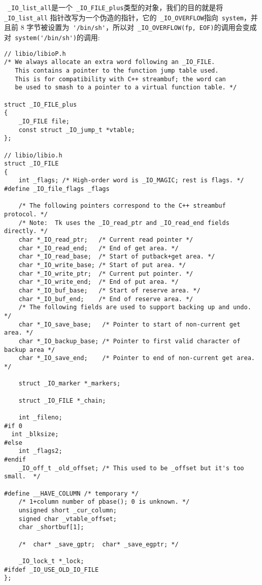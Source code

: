 \verb+ _IO_list_all+是一个\verb+ _IO_FILE_plus+类型的对象，我们的目的就是将\verb+ _IO_list_all+ 指针改写为一个伪造的指针，它的\verb+ _IO_OVERFLOW+指向\verb+ system+，并且前 8 字节被设置为\verb+ '/bin/sh'+，所以对\verb+ _IO_OVERFLOW(fp, EOF)+的调用会变成对\verb+ system('/bin/sh')+的调用:
\begin{verbatim}
// libio/libioP.h
/* We always allocate an extra word following an _IO_FILE.
   This contains a pointer to the function jump table used.
   This is for compatibility with C++ streambuf; the word can
   be used to smash to a pointer to a virtual function table. */

struct _IO_FILE_plus
{
    _IO_FILE file;
    const struct _IO_jump_t *vtable;
};

// libio/libio.h
struct _IO_FILE
{
    int _flags; /* High-order word is _IO_MAGIC; rest is flags. */
#define _IO_file_flags _flags

    /* The following pointers correspond to the C++ streambuf protocol. */
    /* Note:  Tk uses the _IO_read_ptr and _IO_read_end fields directly. */
    char *_IO_read_ptr;   /* Current read pointer */
    char *_IO_read_end;   /* End of get area. */
    char *_IO_read_base;  /* Start of putback+get area. */
    char *_IO_write_base; /* Start of put area. */
    char *_IO_write_ptr;  /* Current put pointer. */
    char *_IO_write_end;  /* End of put area. */
    char *_IO_buf_base;   /* Start of reserve area. */
    char *_IO_buf_end;    /* End of reserve area. */
    /* The following fields are used to support backing up and undo. */
    char *_IO_save_base;   /* Pointer to start of non-current get area. */
    char *_IO_backup_base; /* Pointer to first valid character of backup area */
    char *_IO_save_end;    /* Pointer to end of non-current get area. */

    struct _IO_marker *_markers;

    struct _IO_FILE *_chain;

    int _fileno;
#if 0
  int _blksize;
#else
    int _flags2;
#endif
    _IO_off_t _old_offset; /* This used to be _offset but it's too small.  */

#define __HAVE_COLUMN /* temporary */
    /* 1+column number of pbase(); 0 is unknown. */
    unsigned short _cur_column;
    signed char _vtable_offset;
    char _shortbuf[1];

    /*  char* _save_gptr;  char* _save_egptr; */

    _IO_lock_t *_lock;
#ifdef _IO_USE_OLD_IO_FILE
};

\end{verbatim}


